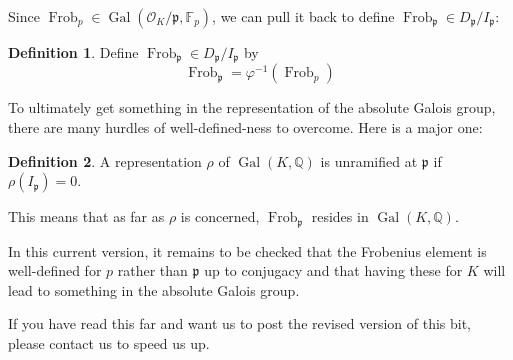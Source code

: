 \documentclass{article}
\theoremstyle{definition}
\newtheorem{definition}{Definition}[section]
\theoremstyle{definition}
\theoremstyle{definition}
\newcommand{\Gal}{\operatorname{Gal}}
\newcommand{\Frob}{\operatorname{Frob}}
\newcommand{\Q}{\mathbb{Q}}
\newcommand{\F}{\mathbb{F}}
\begin{document}
Since $\Frob_p\in \Gal(\mathcal{O}_K/\mathfrak{p},\F_p)$, we can pull it back to define $\Frob_{\mathfrak{p}}\in D_{\mathfrak{p}}/I_{\mathfrak{p}}$:

\begin{definition}Define $\Frob_{\mathfrak{p}}\in D_{\mathfrak{p}}/I_{\mathfrak{p}}$ by
    $$\Frob_{\mathfrak{p}}=\varphi^{-1}(\Frob_p)$$
\end{definition}

To ultimately get something in the representation of the absolute Galois group, there are many hurdles of well-defined-ness to overcome. Here is a major one:

\begin{definition} A representation $\rho$ of $\Gal(K,\Q)$ is unramified at $\mathfrak{p}$ if $\rho(I_{\mathfrak{p}})=0$.
\end{definition}
This means that as far as $\rho$ is concerned, $\Frob_{\mathfrak{p}}$ resides in $\Gal(K,\Q)$.

In this current version, it remains to be checked that the Frobenius element is well-defined for $p$ rather than $\mathfrak{p}$ up to conjugacy and that having these for $K$ will lead to something in the absolute Galois group.


If you have read this far and want us to post the revised version of this bit, please contact us to speed us up.

\end{document}
